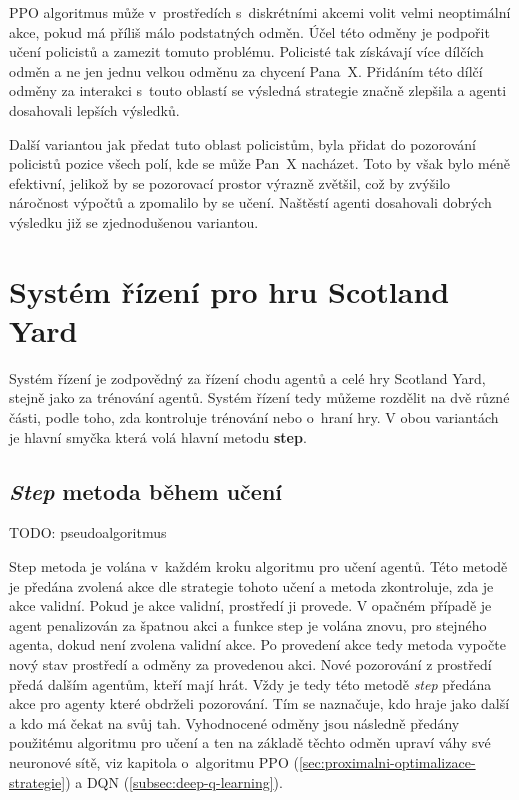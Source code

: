 PPO algoritmus může v~prostředích s~diskrétními akcemi volit velmi neoptimální akce, pokud má příliš málo podstatných odměn\cite{PPO_weakness}.
Účel této odměny je podpořit učení policistů a zamezit tomuto problému.
Policisté tak získávají více dílčích odměn a ne jen jednu velkou odměnu za chycení Pana~X\@.
Přidáním této dílčí odměny za interakci s~touto oblastí se výsledná strategie značně zlepšila a agenti dosahovali lepších výsledků.

Další variantou jak předat tuto oblast policistům, byla přidat do pozorování policistů pozice všech polí, kde se může Pan~X nacházet.
Toto by však bylo méně efektivní, jelikož by se pozorovací prostor výrazně zvětšil, což by zvýšilo náročnost výpočtů a zpomalilo by se učení.
Naštěstí agenti dosahovali dobrých výsledku již se zjednodušenou variantou.

\section{Systém řízení pro hru Scotland Yard}
\label{sec:system_rizeni}
Systém řízení je zodpovědný za řízení chodu agentů a celé hry Scotland Yard, stejně jako za trénování agentů.
Systém řízení tedy můžeme rozdělit na dvě různé části, podle toho, zda kontroluje trénování nebo o~hraní hry.
V obou variantách je hlavní smyčka která volá hlavní metodu \textbf{step}.

\subsection{\emph{Step} metoda během učení}
{\color{red}TODO: pseudoalgoritmus}

Step metoda je volána v~každém kroku algoritmu pro učení agentů.
Této metodě je předána zvolená akce dle strategie tohoto učení a metoda zkontroluje, zda je akce validní.
Pokud je akce validní, prostředí ji provede.
V opačném případě je agent penalizován za špatnou akci a funkce step je volána znovu, pro stejného agenta, dokud není zvolena validní akce.
Po provedení akce tedy metoda vypočte nový stav prostředí a odměny za provedenou akci.
Nové pozorování z prostředí předá dalším agentům, kteří mají hrát.
Vždy je tedy této metodě \emph{step} předána akce pro agenty které obdrželi pozorování.
Tím se naznačuje, kdo hraje jako další a kdo má čekat na svůj tah.
Vyhodnocené odměny jsou následně předány použitému algoritmu pro učení a ten na základě těchto odměn upraví váhy své neuronové sítě, viz kapitola o~algoritmu PPO (\ref{sec:proximalni-optimalizace-strategie}) a DQN (\ref{subsec:deep-q-learning}).

